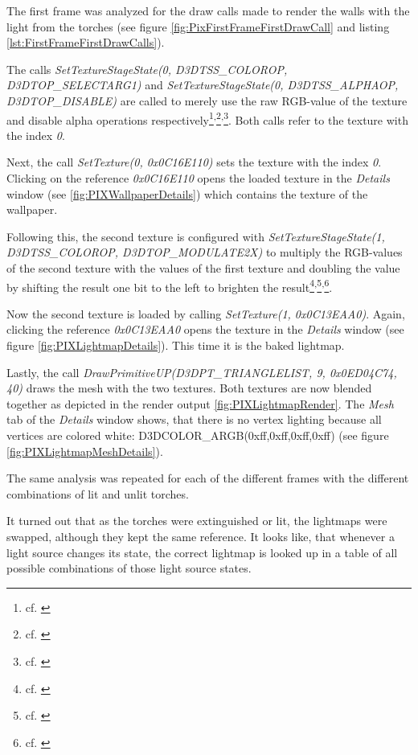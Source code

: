 The first frame was analyzed for the draw calls made to render the walls with the light from the torches (see figure \ref{fig:PixFirstFrameFirstDrawCall} and listing \ref{lst:FirstFrameFirstDrawCalls}).

The calls \textit{SetTextureStageState(0, D3DTSS\_COLOROP, D3DTOP\_SELECTARG1)} and	\textit{SetTextureStageState(0, D3DTSS\_ALPHAOP, D3DTOP\_DISABLE)} are called to merely use the raw RGB-value of the texture and disable alpha operations respectively\footnote{cf. \cite{SetTextureStageState}}\textsuperscript{,}\footnote{cf. \cite{D3DTEXTUREOP}}\textsuperscript{,}\footnote{cf. \cite{D3DTEXTURESTAGESTATETYPE}}.  Both calls refer to the texture with the index \textit{0}. 				

Next, the call \textit{SetTexture(0, 0x0C16E110)} sets the texture with the index \textit{0}. Clicking on the reference \textit{0x0C16E110} opens the loaded texture in the \textit{Details} window (see \ref{fig:PIXWallpaperDetails}) which contains the texture of the wallpaper.

Following this, the second texture is configured with \textit{SetTextureStageState(1, D3DTSS\_COLOROP, D3DTOP\_MODULATE2X)} to multiply the RGB-values of the second texture with the values of the first texture and doubling the value by shifting the result one bit to the left to brighten the result\footnote{cf. \cite{SetTextureStageState}}\textsuperscript{,}\footnote{cf. \cite{D3DTEXTUREOP}}\textsuperscript{,}\footnote{cf. \cite{D3DTEXTURESTAGESTATETYPE}}.		

Now the second texture is loaded by calling \textit{SetTexture(1, 0x0C13EAA0)}. Again, clicking the reference \textit{0x0C13EAA0} opens the texture in the \textit{Details} window  (see figure \ref{fig:PIXLightmapDetails}). This time it is the baked lightmap.

Lastly, the call \textit{DrawPrimitiveUP(D3DPT\_TRIANGLELIST, 9, 0x0ED04C74, 40)} draws the mesh with the two textures. Both textures are now blended together as depicted in the render output \ref{fig:PIXLightmapRender}. The \textit{Mesh} tab of the \textit{Details} window shows, that there is no vertex lighting because all vertices are colored white: D3DCOLOR\_ARGB(0xff,0xff,0xff,0xff) (see figure \ref{fig:PIXLightmapMeshDetails}).



The same analysis was repeated for each of the different frames with the different combinations of lit and unlit torches.

It turned out that as the torches were extinguished or lit, the lightmaps were swapped, although they kept the same reference. It looks like, that whenever a light source changes its state, the correct lightmap is looked up in a table of all possible combinations of those light source states.

